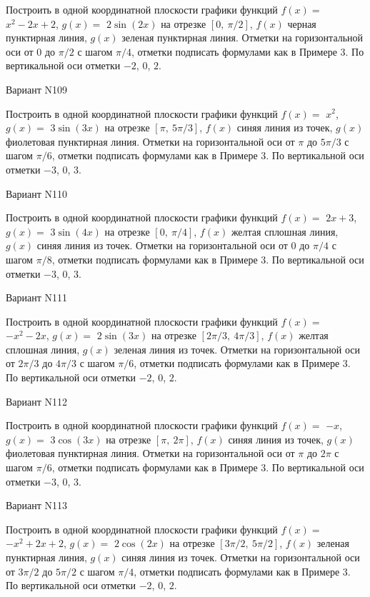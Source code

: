 \documentclass[11pt]{report}
\begin{document}
Построить в одной координатной плоскости графики функций $f(x) = $
    $x^{2} - 2 x + 2$, $g(x) = $
    $2 \sin{\left(2 x \right)}$ на 
    отрезке $\left[ 0, \  \pi / 2\right]$, $f(x)$ черная 
    пунктирная линия, $g(x)$ зеленая пунктирная линия. 
    Отметки на горизонтальной оси от $0$ до $\pi / 2$ с 
    шагом $\pi / 4$, отметки подписать формулами как в Примере 3.  
    По вертикальной оси отметки $-2$, 0, $2$.

Вариант N109

Построить в одной координатной плоскости графики функций $f(x) = $
    $x^{2}$, $g(x) = $
    $3 \sin{\left(3 x \right)}$ на 
    отрезке $\left[ \pi, \  5 \pi / 3\right]$, $f(x)$ синяя 
    линия из точек, $g(x)$ фиолетовая пунктирная линия. 
    Отметки на горизонтальной оси от $\pi$ до $5 \pi / 3$ с 
    шагом $\pi / 6$, отметки подписать формулами как в Примере 3.  
    По вертикальной оси отметки $-3$, 0, $3$.

Вариант N110

Построить в одной координатной плоскости графики функций $f(x) = $
    $2 x + 3$, $g(x) = $
    $3 \sin{\left(4 x \right)}$ на 
    отрезке $\left[ 0, \  \pi / 4\right]$, $f(x)$ желтая 
    сплошная линия, $g(x)$ синяя линия из точек. 
    Отметки на горизонтальной оси от $0$ до $\pi / 4$ с 
    шагом $\pi / 8$, отметки подписать формулами как в Примере 3.  
    По вертикальной оси отметки $-3$, 0, $3$.

Вариант N111

Построить в одной координатной плоскости графики функций $f(x) = $
    $- x^{2} - 2 x$, $g(x) = $
    $2 \sin{\left(3 x \right)}$ на 
    отрезке $\left[ 2 \pi / 3, \  4 \pi / 3\right]$, $f(x)$ желтая 
    сплошная линия, $g(x)$ зеленая линия из точек. 
    Отметки на горизонтальной оси от $2 \pi / 3$ до $4 \pi / 3$ с 
    шагом $\pi / 6$, отметки подписать формулами как в Примере 3.  
    По вертикальной оси отметки $-2$, 0, $2$.

Вариант N112

Построить в одной координатной плоскости графики функций $f(x) = $
    $- x$, $g(x) = $
    $3 \cos{\left(3 x \right)}$ на 
    отрезке $\left[ \pi, \  2 \pi\right]$, $f(x)$ синяя 
    линия из точек, $g(x)$ фиолетовая пунктирная линия. 
    Отметки на горизонтальной оси от $\pi$ до $2 \pi$ с 
    шагом $\pi / 6$, отметки подписать формулами как в Примере 3.  
    По вертикальной оси отметки $-3$, 0, $3$.

Вариант N113

Построить в одной координатной плоскости графики функций $f(x) = $
    $- x^{2} + 2 x + 2$, $g(x) = $
    $2 \cos{\left(2 x \right)}$ на 
    отрезке $\left[ 3 \pi / 2, \  5 \pi / 2\right]$, $f(x)$ зеленая 
    пунктирная линия, $g(x)$ синяя линия из точек. 
    Отметки на горизонтальной оси от $3 \pi / 2$ до $5 \pi / 2$ с 
    шагом $\pi / 4$, отметки подписать формулами как в Примере 3.  
    По вертикальной оси отметки $-2$, 0, $2$.
\end{document}
